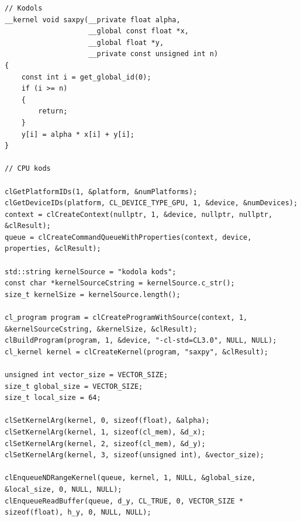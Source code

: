 \begin{lstlisting}[caption={OpenCL GPGPU kodols un izsaukšana no C++},
  label=lst:opencl_kernel_exec,
  captionpos=b
]
// Kodols
__kernel void saxpy(__private float alpha,
                    __global const float *x,
                    __global float *y,
                    __private const unsigned int n)
{
    const int i = get_global_id(0);
    if (i >= n)
    {
        return;
    }
    y[i] = alpha * x[i] + y[i];
}

// CPU kods

clGetPlatformIDs(1, &platform, &numPlatforms);
clGetDeviceIDs(platform, CL_DEVICE_TYPE_GPU, 1, &device, &numDevices);
context = clCreateContext(nullptr, 1, &device, nullptr, nullptr, &clResult);
queue = clCreateCommandQueueWithProperties(context, device, properties, &clResult);

std::string kernelSource = "kodola kods";
const char *kernelSourceCstring = kernelSource.c_str();
size_t kernelSize = kernelSource.length();

cl_program program = clCreateProgramWithSource(context, 1, &kernelSourceCstring, &kernelSize, &clResult);
clBuildProgram(program, 1, &device, "-cl-std=CL3.0", NULL, NULL);
cl_kernel kernel = clCreateKernel(program, "saxpy", &clResult);

unsigned int vector_size = VECTOR_SIZE;
size_t global_size = VECTOR_SIZE;
size_t local_size = 64;

clSetKernelArg(kernel, 0, sizeof(float), &alpha);
clSetKernelArg(kernel, 1, sizeof(cl_mem), &d_x);
clSetKernelArg(kernel, 2, sizeof(cl_mem), &d_y);
clSetKernelArg(kernel, 3, sizeof(unsigned int), &vector_size);

clEnqueueNDRangeKernel(queue, kernel, 1, NULL, &global_size, &local_size, 0, NULL, NULL);
clEnqueueReadBuffer(queue, d_y, CL_TRUE, 0, VECTOR_SIZE * sizeof(float), h_y, 0, NULL, NULL);
\end{lstlisting}

